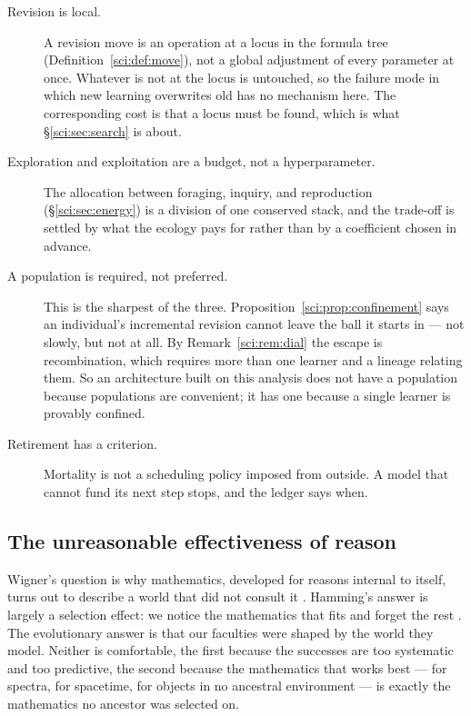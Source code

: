 \begin{description}
\item[Revision is local.] A revision move is an operation at a locus in the formula tree
(Definition~\ref{sci:def:move}), not a global adjustment of every parameter at once. Whatever is not at the
locus is untouched, so the failure mode in which new learning overwrites old has no mechanism here.
The corresponding cost is that a locus must be found, which is what \S\ref{sci:sec:search} is about.

\item[Exploration and exploitation are a budget, not a hyperparameter.] The allocation between
foraging, inquiry, and reproduction (\S\ref{sci:sec:energy}) is a division of one conserved stack, and the
trade-off is settled by what the ecology pays for rather than by a coefficient chosen in advance.

\item[A population is required, not preferred.] This is the sharpest of the three.
Proposition~\ref{sci:prop:confinement} says an individual's incremental revision cannot leave the ball it
starts in --- not slowly, but not at all. By Remark~\ref{sci:rem:dial} the escape is recombination, which
requires more than one learner and a lineage relating them. So an architecture built on this analysis
does not have a population because populations are convenient; it has one because a single learner is
provably confined.

\item[Retirement has a criterion.] Mortality is not a scheduling policy imposed from outside. A model
that cannot fund its next step stops, and the ledger says when.
\end{description}

\subsection{The unreasonable effectiveness of reason}\label{sci:S17.3}

Wigner's question is why mathematics, developed for reasons internal to itself, turns out to describe a
world that did not consult it \cite{Wigner}. Hamming's answer is largely a selection effect: we notice
the mathematics that fits and forget the rest \cite{Hamming}. The evolutionary answer is that our
faculties were shaped by the world they model. Neither is comfortable, the first because the successes
are too systematic and too predictive, the second because the mathematics that works best --- for
spectra, for spacetime, for objects in no ancestral environment --- is exactly the mathematics no
ancestor was selected on.

